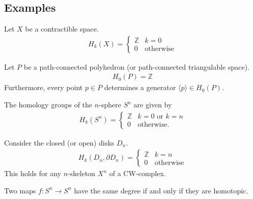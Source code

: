 \subsection{Examples}

    \begin{example}\label{topology:point_homology}
        Let $X$ be a contractible space.
        \begin{gather}
            H_k(X) =
            \begin{cases}
                \mathbb{Z}&k=0\\
                0&\text{otherwise}
            \end{cases}
        \end{gather}
    \end{example}
    \begin{example}
        Let $P$ be a path-connected polyhedron (or path-connected triangulable space).
        \begin{gather}
            H_0(P) = \mathbb{Z}
        \end{gather}
        Furthermore, every point $p\in P$ determines a generator $\langle p \rangle\in H_0(P)$.
    \end{example}

    \begin{example}
        The homology groups of the $n$-sphere $S^n$ are given by
        \begin{gather}
            H_k(S^n)=
            \begin{cases}
                \mathbb{Z}&k=0\text{ or }k=n\\
                0&\text{otherwise}.
            \end{cases}
        \end{gather}
    \end{example}
    \begin{example}
        Consider the closed (or open) disks $D_n$.
        \begin{gather}
            H_k(D_n, \partial D_n) =
            \begin{cases}
                \mathbb{Z}&k=n\\
                0&\text{otherwise}
            \end{cases}
        \end{gather}
        This holds for any $n$-skeleton $X^n$ of a CW-complex.
    \end{example}

    \begin{property}
        Two maps $f:S^n\rightarrow S^n$ have the same degree if and only if they are homotopic.
    \end{property}

